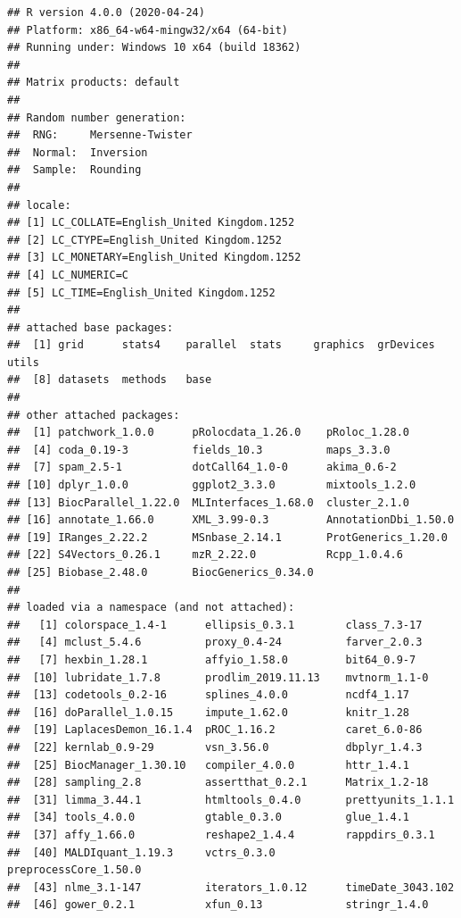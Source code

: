\documentclass[
]{article}
\begin{document}
\begin{verbatim}
## R version 4.0.0 (2020-04-24)
## Platform: x86_64-w64-mingw32/x64 (64-bit)
## Running under: Windows 10 x64 (build 18362)
## 
## Matrix products: default
## 
## Random number generation:
##  RNG:     Mersenne-Twister 
##  Normal:  Inversion 
##  Sample:  Rounding 
##  
## locale:
## [1] LC_COLLATE=English_United Kingdom.1252 
## [2] LC_CTYPE=English_United Kingdom.1252   
## [3] LC_MONETARY=English_United Kingdom.1252
## [4] LC_NUMERIC=C                           
## [5] LC_TIME=English_United Kingdom.1252    
## 
## attached base packages:
##  [1] grid      stats4    parallel  stats     graphics  grDevices utils    
##  [8] datasets  methods   base     
## 
## other attached packages:
##  [1] patchwork_1.0.0      pRolocdata_1.26.0    pRoloc_1.28.0       
##  [4] coda_0.19-3          fields_10.3          maps_3.3.0          
##  [7] spam_2.5-1           dotCall64_1.0-0      akima_0.6-2         
## [10] dplyr_1.0.0          ggplot2_3.3.0        mixtools_1.2.0      
## [13] BiocParallel_1.22.0  MLInterfaces_1.68.0  cluster_2.1.0       
## [16] annotate_1.66.0      XML_3.99-0.3         AnnotationDbi_1.50.0
## [19] IRanges_2.22.2       MSnbase_2.14.1       ProtGenerics_1.20.0 
## [22] S4Vectors_0.26.1     mzR_2.22.0           Rcpp_1.0.4.6        
## [25] Biobase_2.48.0       BiocGenerics_0.34.0 
## 
## loaded via a namespace (and not attached):
##   [1] colorspace_1.4-1      ellipsis_0.3.1        class_7.3-17         
##   [4] mclust_5.4.6          proxy_0.4-24          farver_2.0.3         
##   [7] hexbin_1.28.1         affyio_1.58.0         bit64_0.9-7          
##  [10] lubridate_1.7.8       prodlim_2019.11.13    mvtnorm_1.1-0        
##  [13] codetools_0.2-16      splines_4.0.0         ncdf4_1.17           
##  [16] doParallel_1.0.15     impute_1.62.0         knitr_1.28           
##  [19] LaplacesDemon_16.1.4  pROC_1.16.2           caret_6.0-86         
##  [22] kernlab_0.9-29        vsn_3.56.0            dbplyr_1.4.3         
##  [25] BiocManager_1.30.10   compiler_4.0.0        httr_1.4.1           
##  [28] sampling_2.8          assertthat_0.2.1      Matrix_1.2-18        
##  [31] limma_3.44.1          htmltools_0.4.0       prettyunits_1.1.1    
##  [34] tools_4.0.0           gtable_0.3.0          glue_1.4.1           
##  [37] affy_1.66.0           reshape2_1.4.4        rappdirs_0.3.1       
##  [40] MALDIquant_1.19.3     vctrs_0.3.0           preprocessCore_1.50.0
##  [43] nlme_3.1-147          iterators_1.0.12      timeDate_3043.102    
##  [46] gower_0.2.1           xfun_0.13             stringr_1.4.0        

\end{verbatim}
\end{document}
